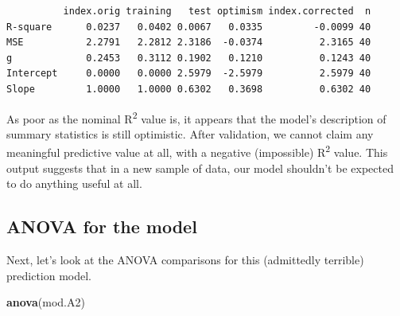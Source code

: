 \documentclass[]{book}
\newenvironment{Shaded}{\begin{snugshade}}{\end{snugshade}}
\newcommand{\KeywordTok}[1]{\textcolor[rgb]{0.13,0.29,0.53}{\textbf{#1}}}
\newcommand{\NormalTok}[1]{#1}
\theoremstyle{definition}
\theoremstyle{definition}
\theoremstyle{definition}
\theoremstyle{remark}
\begin{document}
\begin{verbatim}
          index.orig training   test optimism index.corrected  n
R-square      0.0237   0.0402 0.0067   0.0335         -0.0099 40
MSE           2.2791   2.2812 2.3186  -0.0374          2.3165 40
g             0.2453   0.3112 0.1902   0.1210          0.1243 40
Intercept     0.0000   0.0000 2.5979  -2.5979          2.5979 40
Slope         1.0000   1.0000 0.6302   0.3698          0.6302 40
\end{verbatim}

As poor as the nominal R\textsuperscript{2} value is, it appears that
the model's description of summary statistics is still optimistic. After
validation, we cannot claim any meaningful predictive value at all, with
a negative (impossible) R\textsuperscript{2} value. This output suggests
that in a new sample of data, our model shouldn't be expected to do
anything useful at all.

\subsection{ANOVA for the model}\label{anova-for-the-model-2}

Next, let's look at the ANOVA comparisons for this (admittedly terrible)
prediction model.

\begin{Shaded}
\begin{Highlighting}[]
\KeywordTok{anova}\NormalTok{(mod.A2)}
\end{Highlighting}
\end{Shaded}
\end{document}
